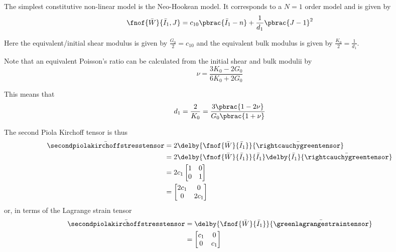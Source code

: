 The simplest constitutive non-linear model is the Neo-Hookean model. It corresponds to a $N=1$ order model and is given by
\begin{equation}
   \fnof{\bar{W}}{\bar{I}_{1},J}=c_{10}\pbrac{\bar{I}_{1}-n}+\dfrac{1}{d_{1}}\pbrac{J-1}^{2}
\end{equation}

Here the equivalent/initial shear modulus is given by $\frac{G_{0}}{2}=c_{10}$ and the equivalent bulk modulus is given by $\frac{K_{0}}{2}=\frac{1}{d_{1}}$.

Note that an equivalent Poisson's ratio can be calculated from the initial shear and bulk modulii by
\begin{equation}
  \nu=\frac{3K_{0}-2G_{0}}{6K_{0}+2G_{0}}
\end{equation}

This means that
\begin{equation}
  d_{1}=\dfrac{2}{K_{0}}=\dfrac{3\pbrac{1-2\nu}}{G_{0}\pbrac{1+\nu}}
\end{equation}


The second Piola Kirchoff tensor is thus
\begin{equation}
  \begin{split}
    \bar{\secondpiolakirchoffstresstensor}&=2\delby{\fnof{\bar{W}}{\bar{I}_{1}}}{\bar{\rightcauchygreentensor}}\\
      &=2\delby{\fnof{\bar{W}}{\bar{I}_{1}}}{\bar{I}_{1}}\delby{\bar{I}_{1}}{\bar{\rightcauchygreentensor}}\\
      &=2c_{1}\begin{bmatrix}
        1 & 0 \\
        0 & 1
      \end{bmatrix} \\
      &=\begin{bmatrix}
      2c_{1} & 0 \\
      0 & 2c_{1}
      \end{bmatrix}
  \end{split}
\end{equation}
or, in terms of the Lagrange strain tensor
\begin{equation}
  \begin{split}
    \bar{\secondpiolakirchoffstresstensor}&=\delby{\fnof{\bar{W}}{\bar{I}_{1}}}{\bar{\greenlagrangestraintensor}}\\
    &=\begin{bmatrix}
    c_{1} & 0 \\
    0 & c_{1}
    \end{bmatrix}
  \end{split}
\end{equation}

